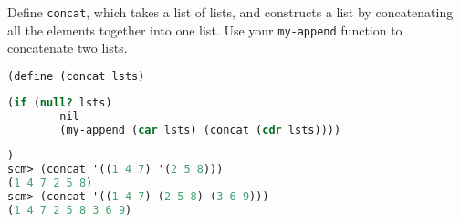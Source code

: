 \question Define {\tt concat}, which takes a list of lists, and constructs
a list by concatenating all the elements together into one list.
Use your {\tt my-append} function to concatenate two lists.
\begin{lstlisting}[language=Scheme]
(define (concat lsts)
\end{lstlisting}
\begin{solution}[1.5in]
\begin{lstlisting}[language=Scheme]
    (if (null? lsts)
        nil
        (my-append (car lsts) (concat (cdr lsts))))
\end{lstlisting}
\end{solution}
\begin{lstlisting}[language=Scheme]
)
scm> (concat '((1 4 7) '(2 5 8)))
(1 4 7 2 5 8)
scm> (concat '((1 4 7) (2 5 8) (3 6 9)))
(1 4 7 2 5 8 3 6 9)
\end{lstlisting}
